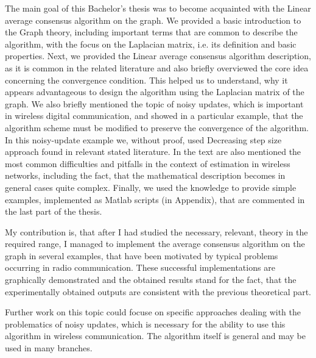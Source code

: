 The main goal of this Bachelor's thesis was to become acquainted with the Linear average consensus algorithm on the graph. We provided a basic introduction to the Graph theory, including important terms that are common to describe the algorithm, with the focus on the Laplacian matrix, i.e. its definition and basic properties. Next, we provided the Linear average consensus algorithm description, as it is common in the related literature and also briefly overviewed the core idea concerning the convergence condition. This helped us to understand, why it appears advantageous to design the algorithm using the Laplacian matrix of the graph. We also briefly mentioned the topic of noisy updates, which is important in wireless digital communication, and showed in a particular example, that the algorithm scheme must be modified to preserve the convergence of the algorithm. In this noisy-update example we, without proof, used Decreasing step size approach found in relevant stated literature. In the text are also mentioned the most common difficulties and pitfalls in the context of estimation in wireless networks, including the fact, that the mathematical description becomes in general cases quite complex. Finally, we used the knowledge to provide simple examples, implemented as Matlab scripts (in Appendix), that are commented in the last part of the thesis.

My contribution is, that after I had studied the necessary, relevant, theory in the required range, I managed to implement the average consensus algorithm on the graph in several examples, that have been motivated by typical problems occurring in radio communication. These successful implementations are graphically demonstrated and the obtained results stand for the fact, that the experimentally obtained outputs are consistent with the previous theoretical part.

Further work on this topic could focuse on specific approaches dealing with the problematics of noisy updates, which is necessary for the ability to use this algorithm in wireless communication. The algorithm itself is general and may be used in many branches.


